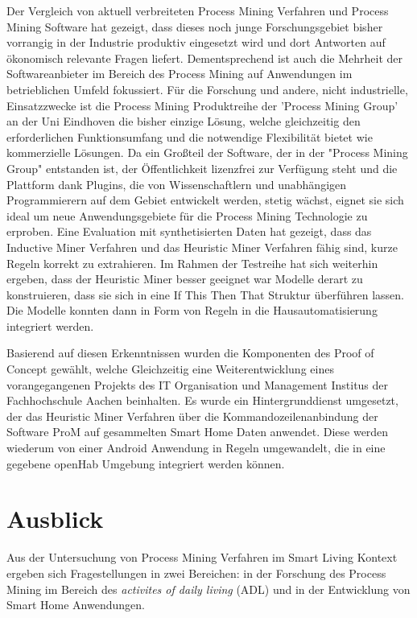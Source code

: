 Der Vergleich von aktuell verbreiteten Process Mining Verfahren und Process Mining Software hat gezeigt, dass dieses noch junge Forschungsgebiet bisher vorrangig in der Industrie produktiv eingesetzt wird und dort Antworten auf ökonomisch relevante Fragen liefert. Dementsprechend ist auch die Mehrheit der Softwareanbieter im Bereich des Process Mining auf Anwendungen im betrieblichen Umfeld fokussiert. 
Für die Forschung und andere, nicht industrielle, Einsatzzwecke ist die Process Mining Produktreihe der 'Process Mining Group' an der Uni Eindhoven die bisher einzige Lösung, welche gleichzeitig den erforderlichen Funktionsumfang und die notwendige Flexibilität bietet wie kommerzielle Lösungen. Da ein Großteil der Software, der in der "Process Mining Group" entstanden ist, der Öffentlichkeit lizenzfrei zur Verfügung steht und die Plattform dank Plugins, die von Wissenschaftlern und unabhängigen Programmierern auf dem Gebiet entwickelt werden, stetig wächst, eignet sie sich ideal um neue Anwendungsgebiete für die Process Mining Technologie zu erproben.
Eine Evaluation mit synthetisierten Daten hat gezeigt, dass das Inductive Miner Verfahren und das Heuristic Miner Verfahren fähig sind, kurze Regeln korrekt zu extrahieren. Im Rahmen der Testreihe hat sich weiterhin ergeben, dass der Heuristic Miner besser geeignet war Modelle derart zu konstruieren, dass sie sich in eine If This Then That Struktur überführen lassen. Die Modelle konnten dann in Form von Regeln in die  Hausautomatisierung integriert werden.

Basierend auf diesen Erkenntnissen wurden die Komponenten des Proof of Concept gewählt, welche Gleichzeitig eine Weiterentwicklung eines vorangegangenen Projekts des IT Organisation und Management Institus der Fachhochschule Aachen beinhalten. Es wurde ein Hintergrunddienst umgesetzt, der das Heuristic Miner Verfahren über die Kommandozeilenanbindung der Software ProM auf gesammelten Smart Home Daten anwendet. Diese werden wiederum von einer Android Anwendung in Regeln umgewandelt, die in eine gegebene openHab Umgebung integriert werden können.
\newpage
\section{Ausblick}
Aus der Untersuchung von Process Mining Verfahren im Smart Living Kontext ergeben sich Fragestellungen in zwei Bereichen: in der Forschung des Process Mining im Bereich des \textit{activites of daily living} (ADL) und in der Entwicklung von Smart Home Anwendungen.

